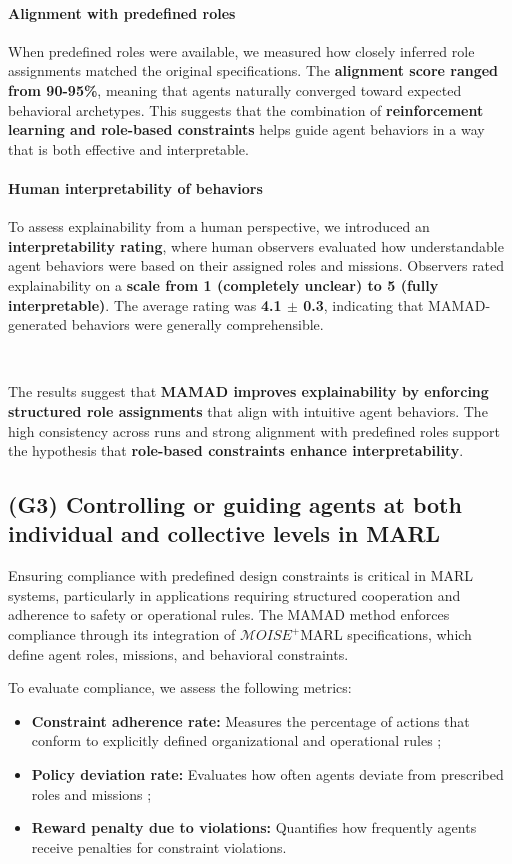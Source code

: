 \documentclass[pdflatex,sn-mathphys-num]{sn-jnl}%
\theoremstyle{thmstyleone}%
\theoremstyle{thmstyletwo}%
\theoremstyle{thmstylethree}%
\begin{document}
\paragraph{Alignment with predefined roles}
When predefined roles were available, we measured how closely inferred role assignments matched the original specifications. The \textbf{alignment score ranged from 90-95\%}, meaning that agents naturally converged toward expected behavioral archetypes. This suggests that the combination of \textbf{reinforcement learning and role-based constraints} helps guide agent behaviors in a way that is both effective and interpretable.

\paragraph{Human interpretability of behaviors}
To assess explainability from a human perspective, we introduced an \textbf{interpretability rating}, where human observers evaluated how understandable agent behaviors were based on their assigned roles and missions. Observers rated explainability on a \textbf{scale from 1 (completely unclear) to 5 (fully interpretable)}. The average rating was \textbf{4.1 $\pm$ 0.3}, indicating that MAMAD-generated behaviors were generally comprehensible.

\

The results suggest that \textbf{MAMAD improves explainability by enforcing structured role assignments} that align with intuitive agent behaviors. The high consistency across runs and strong alignment with predefined roles support the hypothesis that \textbf{role-based constraints enhance interpretability}.


\subsection{(G3) Controlling or guiding agents at both individual and collective levels in MARL}

Ensuring compliance with predefined design constraints is critical in MARL systems, particularly in applications requiring structured cooperation and adherence to safety or operational rules. The MAMAD method enforces compliance through its integration of $\mathcal{M}OISE^+$MARL specifications, which define agent roles, missions, and behavioral constraints. 

To evaluate compliance, we assess the following metrics:

\begin{itemize}
    \item \textbf{Constraint adherence rate:} Measures the percentage of actions that conform to explicitly defined organizational and operational rules ;
    \item \textbf{Policy deviation rate:} Evaluates how often agents deviate from prescribed roles and missions ;
    \item \textbf{Reward penalty due to violations:} Quantifies how frequently agents receive penalties for constraint violations.
\end{itemize}
\end{document}
